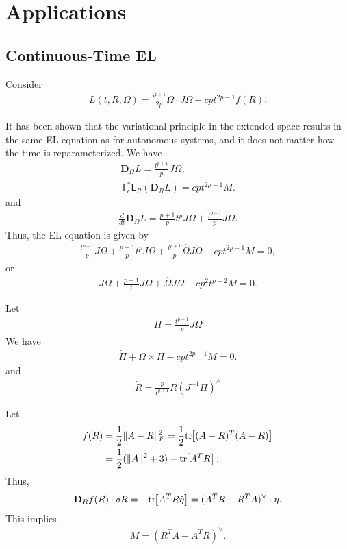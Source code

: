 \documentclass[letterpaper, 10pt, conference]{ieeeconf}
\newcommand{\bracket}[1]{\ensuremath{\left[ #1 \right]}}
\newcommand{\tr}[1]{\mbox{tr}\ensuremath{\negthickspace\bracket{#1}}}
\newcommand{\T}{\ensuremath{\mathsf{T}}}
\renewcommand{\L}{\ensuremath{\mathsf{L}}}
\newcommand{\D}{\ensuremath{\mathbf{D}}}
\begin{document}
\section{Applications}

\subsection{Continuous-Time EL}

Consider
\begin{align*}
    L(t,R,\Omega) = \frac{t^{p+1}}{2p} \Omega\cdot J\Omega - cpt^{2p-1} f(R).
\end{align*}

It has been shown that the variational principle in the extended space results in the same EL equation as for autonomous systems, and it does not matter how the time is reparameterized. 
We have
\begin{align*}
    \D_\Omega L = \frac{t^{p+1}}{p} J\Omega,\\
    \T^*_e \L_R( \D_R L) = cpt^{2p-1} M.
\end{align*}
and
\begin{align*}
    \frac{d}{dt} \D_\Omega L = \frac{p+1}{p} t^p J\Omega + \frac{t^{p+1}}{p} J\dot\Omega.
\end{align*}
Thus, the EL equation is given by
\begin{align*}
    \frac{t^{p+1}}{p} J\dot\Omega + \frac{p+1}{p} t^p J\Omega + \frac{t^{p+1}}{p} \hat\Omega J\Omega - cpt^{2p-1} M = 0,
\end{align*}
or
\begin{align*}
    J\dot\Omega + \frac{p+1}{t} J\Omega + \hat\Omega J\Omega - c p^2 t^{p-2} M = 0.
\end{align*}

Let
\begin{align*}
\Pi = \frac{t^{p+1}}{p} J\Omega
\end{align*}
We have
\begin{align*}
    \dot \Pi + \Omega\times \Pi - cpt^{2p-1} M = 0.
\end{align*}
and
\begin{align*}
    \dot R = \frac{p}{t^{p+1}} R (J^{-1}\Pi)^\wedge
\end{align*}


Let 
\begin{align*}
    f(R) & = \frac{1}{2}\| A- R\|^2_F = \frac{1}{2} \tr{(A-R)^T(A-R)}  \\
         & =\frac{1}{2}(\|A\|^2 + 3) - \tr{A^T R}.
\end{align*}
Thus,
\begin{align*}
    \D_R f(R) \cdot \delta R = -\tr{A^T R\hat\eta} = (A^T R- R^T A)^\vee \cdot \eta.
\end{align*}
This implies
\begin{align*}
    M = (R^T A-A^T R)^\vee.
\end{align*}
\end{document}
